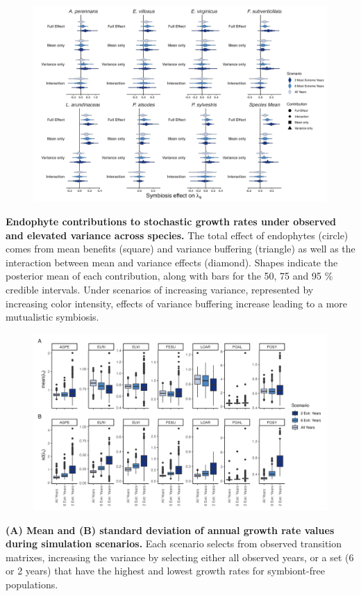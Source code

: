 \documentclass[12pt]{article}
\begin{document}
\begin{figure}
	\centering
	\includegraphics[width=\linewidth]{contributions_obs_plot.png}
\end{figure}
 \textbf{Endophyte contributions to stochastic growth rates under observed and elevated variance across species.} The total effect of endophytes (circle) comes from mean benefits (square) and variance buffering (triangle) as well as the interaction between mean and variance effects (diamond). Shapes indicate the posterior mean of each contribution, along with bars for the 50, 75 and 95 \% credible intervals.  Under scenarios of increasing variance, represented by increasing color intensity, effects of variance buffering increase leading to a more mutualistic symbiosis.
\newpage

\begin{figure}
	\centering
	\includegraphics[width=\linewidth]{sim_boxplots.png}
\end{figure}
 \textbf{(A) Mean and (B) standard deviation of annual growth rate values during simulation scenarios.} Each scenario selects from observed transition matrixes, increasing the variance by selecting either all observed years, or a set (6 or 2 years) that have the highest and lowest growth rates for symbiont-free populations.
\newpage
\end{document}
